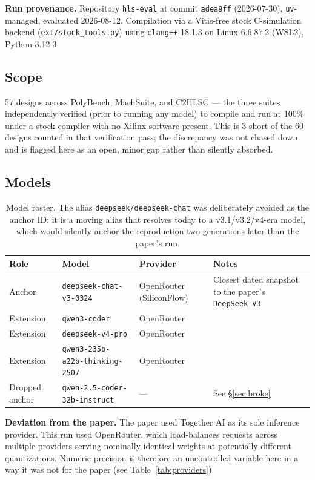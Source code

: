 \documentclass[11pt]{article}
\newcommand{\code}[1]{\texttt{#1}}
\begin{document}
\textbf{Run provenance.} Repository \code{hls-eval} at commit
\code{adea9ff} (2026-07-30), \code{uv}-managed, evaluated 2026-08-12.
Compilation via a Vitis-free stock C-simulation backend
(\code{ext/stock\_tools.py}) using \code{clang++} 18.1.3 on Linux
6.6.87.2 (WSL2), Python 3.12.3.

\subsection{Scope}

57 designs across PolyBench, MachSuite, and C2HLSC --- the three suites
independently verified (prior to running any model) to compile and run
at 100\% under a stock compiler with no Xilinx software present. This is
3 short of the 60 designs counted in that verification pass; the
discrepancy was not chased down and is flagged here as an open, minor
gap rather than silently absorbed.

\subsection{Models}

\begin{table}[h]
\centering
\begin{tabular}{@{}llll@{}}
\toprule
\textbf{Role} & \textbf{Model} & \textbf{Provider} & \textbf{Notes} \\
\midrule
Anchor & \code{deepseek-chat-v3-0324} & OpenRouter (SiliconFlow) & Closest dated snapshot to the paper's \code{DeepSeek-V3} \\
Extension & \code{qwen3-coder} & OpenRouter & \\
Extension & \code{deepseek-v4-pro} & OpenRouter & \\
Extension & \code{qwen3-235b-a22b-thinking-2507} & OpenRouter & \\
Dropped anchor & \code{qwen-2.5-coder-32b-instruct} & --- & See \S\ref{sec:broke} \\
\bottomrule
\end{tabular}
\caption{Model roster. The alias \code{deepseek/deepseek-chat} was
deliberately avoided as the anchor ID: it is a moving alias that
resolves today to a v3.1/v3.2/v4-era model, which would silently anchor
the reproduction two generations later than the paper's run.}
\end{table}

\textbf{Deviation from the paper.} The paper used Together AI as its
sole inference provider. This run used OpenRouter, which load-balances
requests across multiple providers serving nominally identical weights
at potentially different quantizations. Numeric precision is therefore
an uncontrolled variable here in a way it was not for the paper (see
Table~\ref{tab:providers}).
\end{document}

